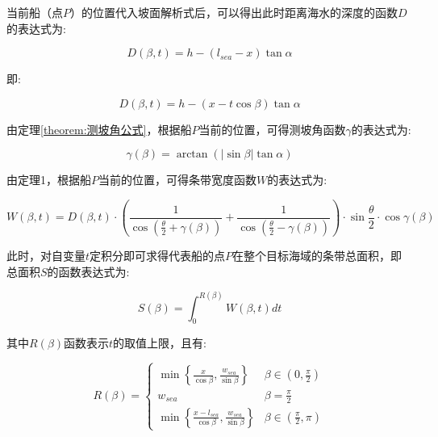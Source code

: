 当前船（点$P$）的位置代入坡面解析式后，可以得出此时距离海水的深度的函数$D$的表达式为:

\begin{equation*}
    D(\beta, t) =
    h - \left(l_{sea} - x\right)\tan \alpha
\end{equation*}

即:

\begin{equation}
    D(\beta, t) =
    h - \left(x - t\cos \beta \right)\tan \alpha
\end{equation}

由定理\ref{theorem:测坡角公式}，根据船$P$当前的位置，可得测坡角函数$\gamma$的表达式为:

\begin{equation}
    \gamma(\beta) =
    \arctan \left(|\sin \beta| \tan \alpha\right)
\end{equation}

由定理1，根据船$P$当前的位置，可得条带宽度函数$W$的表达式为:

\begin{equation}
    W(\beta, t) =
    D(\beta, t)\cdot
    \left(
    \frac{1}{\cos (\frac{\theta}{2} + \gamma(\beta))} +
    \frac{1}{\cos (\frac{\theta}{2} - \gamma(\beta))}
    \right)\cdot
    \sin {\frac{\theta}{2}}\cdot \cos \gamma(\beta)
\end{equation}

此时，对自变量$t$定积分即可求得代表船的点$P$在整个目标海域的条带总面积，即总面积$S$的函数表达式为:

\begin{equation}
    S(\beta) =
    \int _{0} ^{R(\beta)} {
        W(\beta, t)dt
    }
\end{equation}

其中$R(\beta)$函数表示$t$的取值上限，且有:

\begin{equation}
    R(\beta) =
    \begin{cases}
        \min \left \{
        \frac{x}{\cos \beta},
        \frac{w_{sea}}{\sin \beta}
        \right \}
                & \beta \in \left(0, \frac{\pi}{2} \right)   \\
        w_{sea} & \beta = \frac{\pi}{2}                      \\
        \min \left \{
        \frac{x - l_{sea}}{\cos \beta},
        \frac{w_{sea}}{\sin \beta}
        \right \}
                & \beta \in \left(\frac{\pi}{2}, \pi \right)
    \end{cases}
\end{equation}

